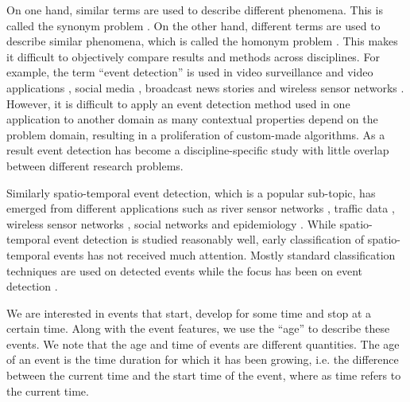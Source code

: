 \documentclass[11pt]{article}
\begin{document}
	On one hand, similar terms are used to describe different phenomena. This is called the synonym problem \cite{zhou2014spatiotemporal}. On the other hand, different terms are used to describe similar phenomena, which is called the homonym problem \cite{zhou2014spatiotemporal}. This makes it difficult to objectively compare results and methods across disciplines. For example, the term ``event detection'' is used in video surveillance and video applications \cite{adam2008robust, ke2005efficient, medioni2001event}, social media \cite{weng2011event, li2012tedas, abdelhaq2013eventweet}, broadcast news stories \cite{allan1998line, li2005probabilistic} and wireless sensor networks \cite{yin2009spatio, mao2015online}. However, it is difficult to apply an event detection method used in one application to another domain as many contextual properties depend on the problem domain, resulting in a proliferation of custom-made algorithms. As a result event detection has become a discipline-specific study with little overlap between different research problems. 
	
	Similarly spatio-temporal event detection, which is a popular sub-topic, has emerged from different applications such as river sensor networks \cite{mao2015online}, traffic data \cite{souto2016event}, wireless sensor networks \cite{mousavi2013spatio}, social networks \cite{cheng2014event} and epidemiology \cite{gomide2011dengue}. While spatio-temporal event detection is  studied reasonably well, early classification of spatio-temporal events has not received much attention. Mostly standard classification techniques are used on detected events while the focus has been on event detection \cite{kang2014detecting}. 
	
	
	We are interested in events that start, develop for some time and stop at a certain time. Along with the event features, we use the ``age'' to describe these events.  We note that the age and time of events are different quantities. The age of an event is the time duration for which it has been growing, i.e. the difference between the current time and the start time of the event, where as time refers to the current time. 
	
\end{document}

